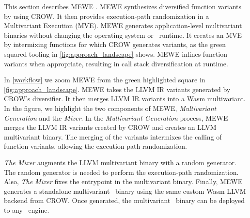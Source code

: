 
\label{section:mewe}

\renewcommand{\tool}{MEWE\xspace}
This section describes MEWE \cite{MEWE}. 
\tool synthesizes diversified function variants by using CROW.
It then provides execution-path randomization in a Multivariant Execution (MVE).
MEWE generates application-level multivariant binaries without changing the operating system or \wasm\ runtime.
It creates an MVE by intermixing functions for which CROW generates variants, as the green squared tooling in \autoref{fig:approach_landscape} shows.
\tool inlines function variants when appropriate, resulting in call stack diversification at runtime.

In \autoref{workflow} we zoom MEWE from the green highlighted square in \autoref{fig:approach_landscape}. 
MEWE takes the LLVM IR variants generated by CROW's diversifier. 
It then merges LLVM IR variants into a Wasm multivariant.
In the figure, we highlight the two components of MEWE, \emph{Multivariant Generation} and the \emph{Mixer}.
In the \emph{Multivariant Generation} process, 
MEWE merges the LLVM IR variants created by CROW and creates an LLVM multivariant binary.
The merging of the variants intermixes the calling of function variants, allowing the execution path randomization.

\emph{The Mixer} augments the LLVM multivariant binary with a random generator. 
The random generator is needed to perform the execution-path randomization.
Also, \emph{The Mixer} fixes the entrypoint in the multivariant binary.
Finally, MEWE generates a standalone multivariant \wasm\ binary using the same custom Wasm LLVM backend from CROW.
Once generated, the multivariant \wasm\ binary can be deployed to any \wasm\ engine. 

